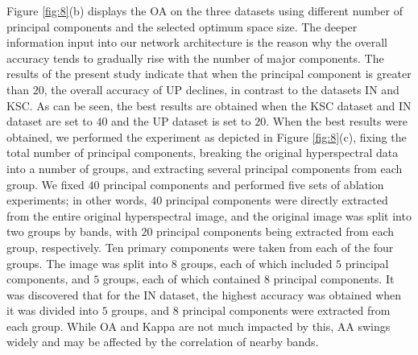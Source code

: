 \documentclass[]{interact}
\theoremstyle{plain}%
\theoremstyle{definition}
\theoremstyle{remark}
\begin{document}
Figure \ref{fig:8}(b) displays the OA on the three datasets using different number of principal components and the selected optimum space size. The deeper information input into our network architecture is the reason why the overall accuracy tends to gradually rise with the number of major components.
The results of the present study indicate that when the principal component is greater than $20$, the overall accuracy of UP declines, in contrast to the datasets IN and KSC. As can be seen, the best results are obtained when the KSC dataset and IN dataset are set to $40$ and the UP dataset  is set to $20$. When the best results were obtained, we performed the experiment as depicted in Figure \ref{fig:8}(c), fixing the total  number of principal components, breaking the original hyperspectral data into a number of groups, and extracting several principal components from each group. We fixed $40$ principal components and performed five sets of ablation experiments; in other words, $40$ principal components were directly extracted from the entire original hyperspectral image, and the original image was split into two groups by bands, with $20$ principal components being extracted from each group, respectively. Ten primary components were taken from each of the four groups. The image was split into $8$ groups, each of which included $5$ principal components, and $5$ groups, each of which contained $8$ principal components. It was discovered that for the IN dataset, the highest accuracy was obtained when it was divided into $5$ groups, and $8$ principal components were extracted from each group. While OA and Kappa are not much impacted by this, AA swings widely and may be affected by the correlation of nearby bands.
\end{document}
